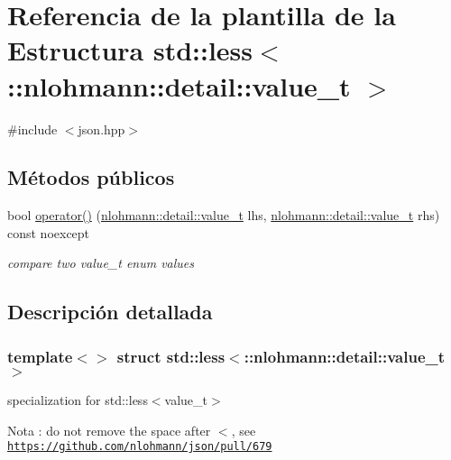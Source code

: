 \hypertarget{structstd_1_1less_3_1_1nlohmann_1_1detail_1_1value__t_01_4}{}\section{Referencia de la plantilla de la Estructura std\+:\+:less$<$\+:\+:nlohmann\+:\+:detail\+:\+:value\+\_\+t $>$}
\label{structstd_1_1less_3_1_1nlohmann_1_1detail_1_1value__t_01_4}


{\ttfamily \#include $<$json.\+hpp$>$}

\subsection*{Métodos públicos}
\begin{DoxyCompactItemize}
\item 
bool \mbox{\hyperlink{structstd_1_1less_3_1_1nlohmann_1_1detail_1_1value__t_01_4_a10d3fea50edf7b15ead8f4ceeb006000}{operator()}} (\mbox{\hyperlink{namespacenlohmann_1_1detail_a1ed8fc6239da25abcaf681d30ace4985}{nlohmann\+::detail\+::value\+\_\+t}} lhs, \mbox{\hyperlink{namespacenlohmann_1_1detail_a1ed8fc6239da25abcaf681d30ace4985}{nlohmann\+::detail\+::value\+\_\+t}} rhs) const noexcept
\begin{DoxyCompactList}\small\item\em compare two value\+\_\+t enum values \end{DoxyCompactList}\end{DoxyCompactItemize}


\subsection{Descripción detallada}
\subsubsection*{template$<$$>$\newline
struct std\+::less$<$\+::nlohmann\+::detail\+::value\+\_\+t $>$}

specialization for std\+::less$<$value\+\_\+t$>$ \begin{DoxyNote}{Nota}
\+: do not remove the space after \textquotesingle{}$<$\textquotesingle{}, see \href{https://github.com/nlohmann/json/pull/679}{\tt https\+://github.\+com/nlohmann/json/pull/679} 
\end{DoxyNote}


